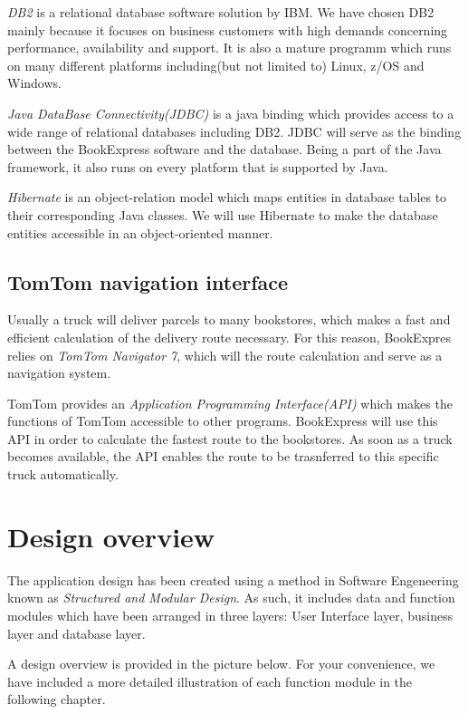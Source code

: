\emph{DB2} is a relational database software solution by IBM. We have chosen DB2 mainly because it focuses on business customers with high demands concerning performance, availability and support. It is also a mature programm which runs on many different platforms including(but not limited to) Linux, z/OS and Windows.

\emph{Java DataBase Connectivity(JDBC)} is a java binding which provides access to a wide range of relational databases including DB2. JDBC will serve as the binding between the BookExpress software and the database. Being a part of the Java framework, it also runs on every platform that is supported by Java.

\emph{Hibernate} is an object-relation model which maps entities in database tables to their corresponding Java classes. We will use Hibernate to make the database entities accessible in an object-oriented manner.
\section{TomTom navigation interface}
Usually a truck will deliver parcels to many bookstores, which makes a fast and efficient calculation of the delivery route necessary. For this reason, BookExpres relies on \emph{TomTom Navigator 7}, which will the route calculation and serve as a navigation system.

TomTom provides an \emph{Application Programming Interface(API)} which makes the functions of TomTom accessible to other programs. BookExpress will use this API in order to calculate the fastest route to the bookstores. As soon as a truck becomes available, the API enables the route to be trasnferred to this specific truck automatically.
\chapter{Design overview}
The application design has been created using a method in Software Engeneering known as \emph{Structured and Modular Design}. As such, it includes data and function modules which have been arranged in three layers: User Interface layer, business layer and database layer.

A design overview is provided in the picture below. For your convenience, we have included a more detailed illustration of each function module in the following chapter.

